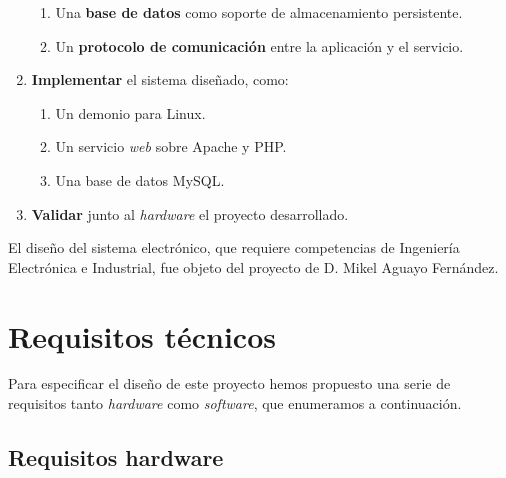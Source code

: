 \documentclass[10pt,a4paper]{article}
\begin{document}
\begin{enumerate}
\begin{enumerate}
			\item Una \textbf{base de datos} como soporte de almacenamiento
			persistente.
			\item Un \textbf{protocolo de comunicación} entre la aplicación
			y el servicio.
		\end{enumerate}
		
		\item \textbf{Implementar} el sistema diseñado, como:
		
		\begin{enumerate}
			\item Un demonio para Linux.
			\item Un servicio \textit{web} sobre Apache y PHP.
			\item Una base de datos MySQL.
		\end{enumerate}
		
		\item \textbf{Validar} junto al \textit{hardware} el proyecto
		desarrollado.
	\end{enumerate}
	
	El diseño del sistema electrónico, que requiere competencias de Ingeniería
	Electrónica e Industrial, fue objeto del proyecto de D. Mikel Aguayo
	Fernández.
	
	
	\section{Requisitos técnicos}
	
	Para especificar el diseño de este proyecto hemos propuesto una serie de
	requisitos tanto \textit{hardware} como \textit{software}, que enumeramos a
	continuación.
	
	\subsection{Requisitos hardware}
	
\end{document}

